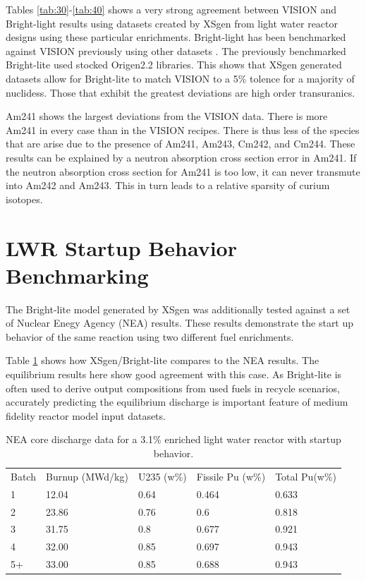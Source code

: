 \documentclass{article}
\begin{document}
Tables \ref{tab:30}-\ref{tab:40} shows a very strong agreement between VISION and Bright-light
results using datasets created by XSgen from light water reactor designs using these particular
enrichments. Bright-light has been benchmarked against VISION previously using other datasets
\cite{brightlite}. The previously benchmarked Bright-lite used stocked Origen2.2 libraries\cite{origen2}. This shows that
XSgen generated datasets allow for Bright-lite to match VISION to a 5\% tolence for a
majority of nuclidess. Those that exhibit the greatest deviations are high order transuranics.

Am241 shows the largest deviations from the VISION data. There is more Am241 in every
case than in the VISION recipes. There is thus less of the species that are arise due to
the presence of Am241, Am243, Cm242, and Cm244. These results can be explained by a
neutron absorption cross section error in Am241. If the neutron absorption cross section for
Am241 is too low, it can never transmute into Am242 and Am243. This in turn leads to a
relative sparsity of curium isotopes.

\section{LWR Startup Behavior Benchmarking}

The Bright-lite model generated by XSgen was additionally tested against a set of
Nuclear Enegy Agency (NEA) results\cite{nea}. These results demonstrate the start up behavior
of the same reaction using two different fuel enrichments.

Table \ref{tab:b} shows how XSgen/Bright-lite compares to the NEA results.
The equilibrium results here show good agreement with this case. As Bright-lite is often
used to derive output compositions from used fuels in recycle scenarios, accurately
predicting the equilibrium discharge is important feature of medium fidelity reactor model
input datasets.

\begin{table}[!htb]
\centering
\caption{NEA core discharge data for a 3.1\% enriched light water reactor with startup behavior.}
\label{tab:b}
\begin{tabular}{lllll}
Batch & Burnup (MWd/kg) & U235 (w\%) & Fissile Pu (w\%) & Total Pu(w\%) \\
1 & 12.04 & 0.64 & 0.464 & 0.633 \\
2 & 23.86 & 0.76 & 0.6 & 0.818 \\
3 & 31.75 & 0.8 & 0.677 & 0.921 \\
4 & 32.00 & 0.85 & 0.697 & 0.943 \\
5+ & 33.00 & 0.85 & 0.688 & 0.943
\end{tabular}
\end{table}
\end{document}

